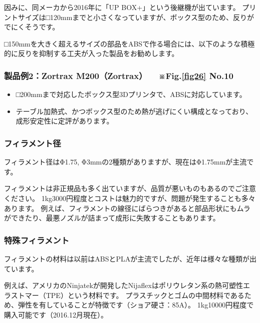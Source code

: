 因みに、同メーカから2016年に「UP BOX+」という後継機が出ています。
プリントサイズは□120mmまでと小さくなっていますが、ボックス型のため、反りがでにくそうです。

□150mmを大きく超えるサイズの部品をABSで作る場合には、以下のような積極的に反りを抑制する工夫が入った製品をお勧めします。

\subsubsection{\texorpdfstring{製品例2：Zortrax M200（Zortrax）
　※Fig.\ref{fig26}
No.10}{製品例2：Zortrax M200（Zortrax） 　※Fig. No.10}}\label{ux88fdux54c1ux4f8b2zortrax-m200zortrax-fig.-no.10}

\begin{itemize}
\tightlist
\item
  □200mmまで対応したボックス型3Dプリンタで、ABSに対応しています。
\item
  テーブル加熱式、かつボックス型のため熱が逃げにくい構成となっており、成形安定性に定評があります。
\end{itemize}

\subsubsection{フィラメント径}\label{ux30d5ux30a3ux30e9ux30e1ux30f3ux30c8ux5f84}

フィラメント径はΦ1.75,
Φ3mmの2種類がありますが、現在はΦ1.75mmが主流です。

フィラメントは非正規品も多く出ていますが、品質が悪いものもあるのでご注意ください。
1kg3000円程度とコストは魅力的ですが、問題が発生することも多々あります。
例えば、フィラメントの線径にばらつきがあると部品形状にもムラができたり、最悪ノズルが詰まって成形に失敗することもあります。

\subsubsection{特殊フィラメント}\label{ux7279ux6b8aux30d5ux30a3ux30e9ux30e1ux30f3ux30c8}

フィラメントの材料は以前はABSとPLAが主流でしたが、近年は様々な種類が出ています。

例えば、アメリカのNinjatekが開発したNijaflex\cite{ninjaflex}はポリウレタン系の熱可塑性エラストマー（TPE）という材料です。
プラスチックとゴムの中間材料であるため、弾性を有していることが特徴です（ショア硬さ：85A）。
1kg10000円程度で購入可能です（2016.12月現在）。

